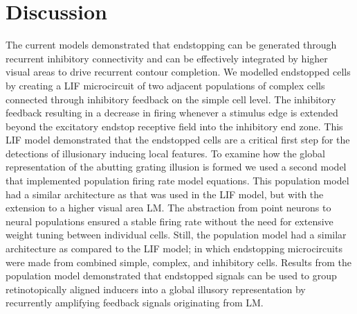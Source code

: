 \documentclass[12pt]{article}
\begin{document}
\newpage
\section*{Discussion}
\setlength{\parindent}{12pt}  
The current models demonstrated that endstopping can be generated through recurrent inhibitory connectivity and can be effectively integrated by higher visual areas to drive recurrent contour completion. We modelled endstopped cells by creating a LIF microcircuit of two adjacent populations of complex cells connected through inhibitory feedback on the simple cell level. The inhibitory feedback resulting in a decrease in firing whenever a stimulus edge is extended beyond the excitatory endstop receptive field into the inhibitory end zone. This LIF model demonstrated that the endstopped cells are a critical first step for the detections of illusionary inducing local features. To examine how the global representation of the abutting grating illusion is formed we used a second model that implemented population firing rate model equations. This population model had a similar architecture as that was used in the LIF model, but with the extension to a higher visual area LM. The abstraction from point neurons to neural populations ensured a stable firing rate without the need for extensive weight tuning between individual cells. Still, the population model had a similar architecture as compared to the LIF model; in which endstopping microcircuits were made from combined simple, complex, and inhibitory cells. Results from the population model demonstrated that endstopped signals can be used to group retinotopically aligned inducers into a global illusory representation by recurrently amplifying feedback signals originating from LM. 
\setlength{\parindent}{0pt}
\bigbreak
\end{document}
